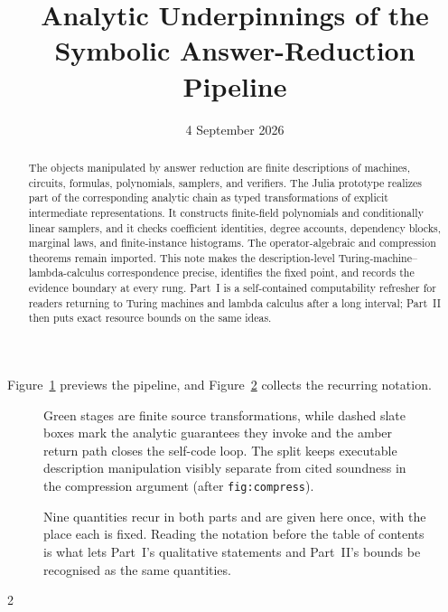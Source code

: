 \documentclass[11pt]{article}
\title{Analytic Underpinnings of the Symbolic Answer-Reduction Pipeline}
\author{}
\date{4 September 2026}
\newcommand{\code}[1]{\nolinkurl{#1}}
\theoremstyle{definition}
\begin{document}
\maketitle

\begin{abstract}
The objects manipulated by answer reduction are finite descriptions of
machines, circuits, formulas, polynomials, samplers, and verifiers.  The Julia
prototype realizes part of the corresponding analytic chain as typed
transformations of explicit intermediate representations.  It constructs
finite-field polynomials and conditionally linear samplers, and it checks
coefficient identities, degree accounts, dependency blocks, marginal laws,
and finite-instance histograms.  The operator-algebraic and compression
theorems remain imported.  This note makes
the description-level Turing-machine--lambda-calculus correspondence precise,
identifies the fixed point, and records the evidence boundary at every rung.
Part~I is a self-contained computability refresher for readers returning to
Turing machines and lambda calculus after a long interval; Part~II then puts
exact resource bounds on the same ideas.
\end{abstract}

Figure~\ref{fig:pipeline-glance} previews the pipeline, and
Figure~\ref{fig:symbol-table} collects the recurring notation.

\vspace{1em}
\begin{figure}[h]
\centering

\caption{Green stages are finite source transformations, while dashed slate boxes mark the analytic guarantees they invoke and the amber return path closes the self-code loop.  The split keeps executable description manipulation visibly separate from cited soundness in the compression argument (after \code{fig:compress}).}
\label{fig:pipeline-glance}
\end{figure}

\begin{figure}[H]
\centering

\caption{Nine quantities recur in both parts and are given here once, with the place each is fixed.  Reading the notation before the table of contents is what lets Part~I's qualitative statements and Part~II's bounds be recognised as the same quantities.}
\label{fig:symbol-table}
\end{figure}

\setcounter{tocdepth}{2}
{\footnotesize\setlength{\parskip}{0pt}\setlength{\columnsep}{2em}\begin{multicols}{2}\tableofcontents\end{multicols}}
\end{document}

